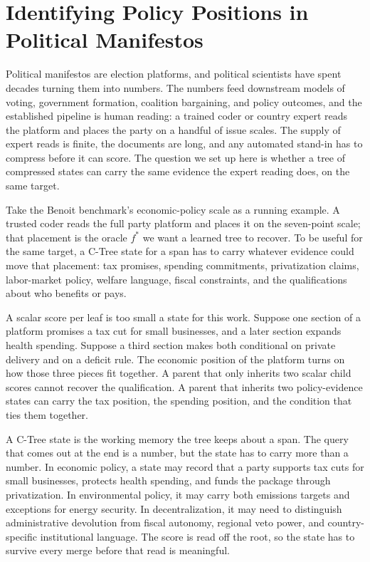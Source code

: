 \section{Identifying Policy Positions in Political Manifestos}
\label{sec:v8-manifesto-mechanism}

Political manifestos are election platforms, and political
scientists have spent decades turning them into numbers. The
numbers feed downstream models of voting, government formation,
coalition bargaining, and policy outcomes, and the established
pipeline is human reading: a trained coder or country expert reads
the platform and places the party on a handful of issue scales.
The supply of expert reads is finite, the documents are long, and
any automated stand-in has to compress before it can score. The
question we set up here is whether a tree of compressed states can
carry the same evidence the expert reading does, on the same
target.

Take the Benoit benchmark's economic-policy scale as a running
example. A trusted coder reads the full party platform and places it
on the seven-point scale; that placement is the oracle \(f^\ast\)
we want a learned tree to recover. To be useful for the same
target, a C-Tree state for a span has to carry whatever evidence
could move that placement: tax promises, spending commitments,
privatization claims, labor-market policy, welfare language, fiscal
constraints, and the qualifications about who benefits or pays.

A scalar score per leaf is too small a state for this work. Suppose
one section of a platform promises a tax cut for small businesses,
and a later section expands health spending. Suppose a third section
makes both conditional on private delivery and on a deficit rule.
The economic position of the platform turns on how those three
pieces fit together. A parent that only inherits two scalar child
scores cannot recover the qualification. A parent that inherits two
policy-evidence states can carry the tax position, the spending
position, and the condition that ties them together.

A C-Tree state is the working memory the tree keeps about a span.
The query that comes out at the end is a number, but the state has
to carry more than a number. In economic policy, a state may record
that a party supports tax cuts for small businesses, protects health
spending, and funds the package through privatization. In
environmental policy, it may carry both emissions targets and
exceptions for energy security. In decentralization, it may need to
distinguish administrative devolution from fiscal autonomy, regional
veto power, and country-specific institutional language. The score
is read off the root, so the state has to survive every merge before
that read is meaningful.

